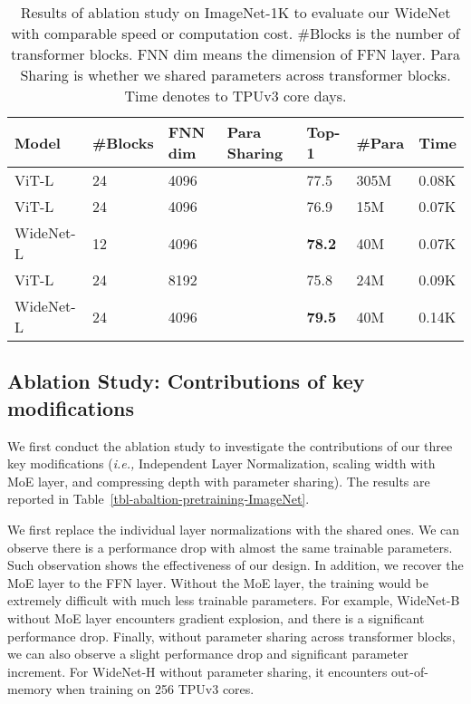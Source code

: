 \documentclass[letterpaper]{article} \usepackage{aaai22}  \usepackage{times}  \usepackage{helvet}  \usepackage{courier}  \usepackage[hyphens]{url}  \usepackage{graphicx} \urlstyle{rm} \def\UrlFont{\rm}  \usepackage{natbib}  \usepackage{caption} \DeclareCaptionStyle{ruled}{labelfont=normalfont,labelsep=colon,strut=off} \frenchspacing  \setlength{\pdfpagewidth}{8.5in}  \setlength{\pdfpageheight}{11in}  \usepackage{algorithm}
\newcommand{\ie}{\emph{i.e.,}\xspace}
\begin{document}
\begin{table*}[t]
\centering
\caption{Results of ablation study on ImageNet-1K to evaluate our WideNet with comparable speed or computation cost. \#Blocks is the number of transformer blocks. FNN dim means the dimension of FFN layer. Para Sharing is whether we shared parameters across transformer blocks. Time denotes to TPUv3 core days.}
\label{tbl-abaltion-2-pretraining-ImageNet}
\begin{tabular}{l|llllll}
\toprule
Model                    & \#Blocks    & FNN dim   & Para Sharing   & Top-1 & \#Para & Time \\ \midrule
ViT-L                     & 24     & 4096    &   & 77.5 & 305M       & 0.08K         \\
ViT-L                     & 24     & 4096    &   & 76.9 & 15M       & 0.07K         \\
WideNet-L                 & 12     & 4096    &   & \textbf{78.2} & 40M        & 0.07K          \\ \midrule
ViT-L    & 24     & 8192   &   & 75.8 & 24M        & 0.09K         \\
WideNet-L                   & 24    & 4096   &   & \textbf{79.5} & 40M        & 0.14K       \\
\bottomrule
\end{tabular}
\end{table*}





\subsection{Ablation Study: Contributions of key modifications}
We first conduct the ablation study to investigate the contributions of our three key modifications (\ie Independent Layer Normalization, scaling width with MoE layer, and compressing depth with parameter sharing). The results are reported in Table~\ref{tbl-abaltion-pretraining-ImageNet}. 


We first replace the individual layer normalizations with the shared ones. We can observe there is a performance drop with almost the same trainable parameters. Such observation shows the effectiveness of our design. In addition, we recover the MoE layer to the FFN layer. Without the MoE layer, the training would be extremely difficult with much less trainable parameters. For example, WideNet-B without MoE layer encounters gradient explosion, and there is a significant performance drop. Finally, without parameter sharing across transformer blocks, we can also observe a slight performance drop and significant parameter increment. For WideNet-H without parameter sharing, it encounters out-of-memory when training on 256 TPUv3 cores. 
\end{document}
